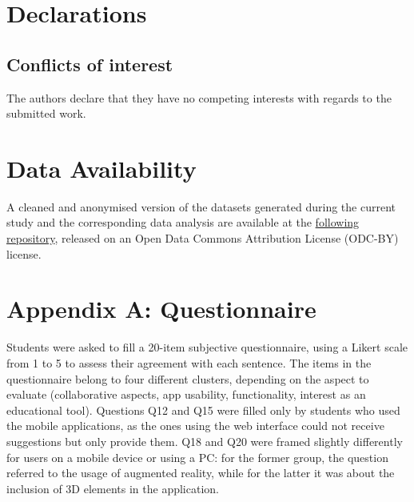 \documentclass[pdflatex,sn-basic,iicol]{sn-jnl}%
\begin{document}
\section*{Declarations}

\subsection*{Conflicts of interest}
The authors declare that they have no competing interests with regards to the submitted work.

\section*{Data Availability}
A cleaned and anonymised version of the datasets generated during the current study and the corresponding data analysis are available at the \href{https://github.com/Stocastico/Evaluation_paper}{following repository}, released on an Open Data Commons Attribution License (ODC-BY) license.



\section*{Appendix A: Questionnaire}\label{sec:appendix}

Students were asked to fill a 20-item subjective questionnaire, using a Likert scale from 1 to 5 to assess their agreement with each sentence. The items in the questionnaire belong to four different clusters, depending on the aspect to evaluate (collaborative aspects, app usability, functionality, interest as an educational tool). Questions Q12 and Q15 were filled only by students who used the mobile applications, as the ones using the web interface could not receive suggestions but only provide them. Q18 and Q20 were framed slightly differently for users on a mobile device or using a PC: for the former group, the question referred to the usage of augmented reality, while for the latter it was about the inclusion of 3D elements in the application. 
\end{document}

